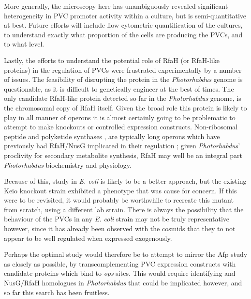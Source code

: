 More generally, the microscopy here has unambiguously revealed significant heterogeneity in PVC promoter activity within a culture, but is semi-quantitative at best. Future efforts will include flow cytometric quantification of the cultures, to understand exactly what proportion of the cells are producing the PVCs, and to what level.

Lastly, the efforts to understand the potential role of RfaH (or RfaH-like proteins) in the regulation of PVCs were frustrated experimentally by a number of issues. The feasibility of disrupting the protein in the \emph{Photorhabdus} genome is questionable, as it is difficult to genetically engineer at the best of times. The only candidate RfaH-like protein detected so far in the \emph{Photorhabdus} genome, is the chromosomal copy of RfaH itself. Given the broad role this protein is likely to play in all manner of operons it is almost certainly going to be problematic to attempt to make knockouts or controlled expression constructs. Non-ribosomal peptide and polyketide synthases \citep{Challinor2015}, are typically long operons which have previously had RfaH/NusG implicated in their regulation \citep{Goodson2017}; given \emph{Photorhabdus}' proclivity for secondary metabolite synthesis, RfaH may well be an integral part \emph{Photorhabdus} biochemistry and physiology.

Because of this, study in \emph{E. coli} is likely to be a better approach, but the existing Keio knockout strain exhibited a phenotype that was cause for concern. If this were to be revisited, it would probably be worthwhile to recreate this mutant from scratch, using a different lab strain. There is always the possibility that the behaviour of the PVCs in any \emph{E. coli} strain may not be truly representative however, since it has already been observed with the cosmids that they to not appear to be well regulated when expressed exogenously.

Perhaps the optimal study would therefore be to attempt to mirror the Afp study as closely as possible, by transcomplementing PVC expression constructs with candidate proteins which bind to \emph{ops} sites. This would require identifying and NusG/RfaH homologues in \emph{Photorhabdus} that could be implicated however, and so far this search has been fruitless.



